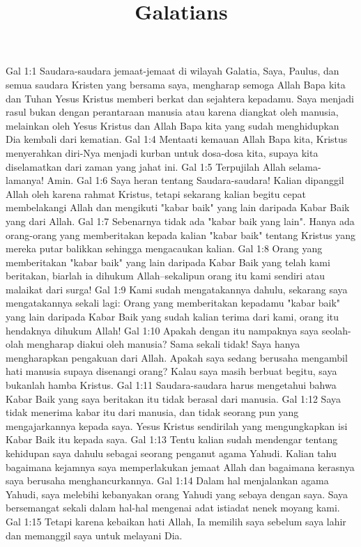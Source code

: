 

\title{Galatians}

Gal 1:1  Saudara-saudara jemaat-jemaat di wilayah Galatia, Saya, Paulus, dan semua saudara Kristen yang bersama saya, mengharap semoga Allah Bapa kita dan Tuhan Yesus Kristus memberi berkat dan sejahtera kepadamu. Saya menjadi rasul bukan dengan perantaraan manusia atau karena diangkat oleh manusia, melainkan oleh Yesus Kristus dan Allah Bapa kita yang sudah menghidupkan Dia kembali dari kematian.
Gal 1:4  Mentaati kemauan Allah Bapa kita, Kristus menyerahkan diri-Nya menjadi kurban untuk dosa-dosa kita, supaya kita diselamatkan dari zaman yang jahat ini.
Gal 1:5  Terpujilah Allah selama-lamanya! Amin.
Gal 1:6  Saya heran tentang Saudara-saudara! Kalian dipanggil Allah oleh karena rahmat Kristus, tetapi sekarang kalian begitu cepat membelakangi Allah dan mengikuti "kabar baik" yang lain daripada Kabar Baik yang dari Allah.
Gal 1:7  Sebenarnya tidak ada "kabar baik yang lain". Hanya ada orang-orang yang memberitakan kepada kalian "kabar baik" tentang Kristus yang mereka putar balikkan sehingga mengacaukan kalian.
Gal 1:8  Orang yang memberitakan "kabar baik" yang lain daripada Kabar Baik yang telah kami beritakan, biarlah ia dihukum Allah--sekalipun orang itu kami sendiri atau malaikat dari surga!
Gal 1:9  Kami sudah mengatakannya dahulu, sekarang saya mengatakannya sekali lagi: Orang yang memberitakan kepadamu "kabar baik" yang lain daripada Kabar Baik yang sudah kalian terima dari kami, orang itu hendaknya dihukum Allah!
Gal 1:10  Apakah dengan itu nampaknya saya seolah-olah mengharap diakui oleh manusia? Sama sekali tidak! Saya hanya mengharapkan pengakuan dari Allah. Apakah saya sedang berusaha mengambil hati manusia supaya disenangi orang? Kalau saya masih berbuat begitu, saya bukanlah hamba Kristus.
Gal 1:11  Saudara-saudara harus mengetahui bahwa Kabar Baik yang saya beritakan itu tidak berasal dari manusia.
Gal 1:12  Saya tidak menerima kabar itu dari manusia, dan tidak seorang pun yang mengajarkannya kepada saya. Yesus Kristus sendirilah yang mengungkapkan isi Kabar Baik itu kepada saya.
Gal 1:13  Tentu kalian sudah mendengar tentang kehidupan saya dahulu sebagai seorang penganut agama Yahudi. Kalian tahu bagaimana kejamnya saya memperlakukan jemaat Allah dan bagaimana kerasnya saya berusaha menghancurkannya.
Gal 1:14  Dalam hal menjalankan agama Yahudi, saya melebihi kebanyakan orang Yahudi yang sebaya dengan saya. Saya bersemangat sekali dalam hal-hal mengenai adat istiadat nenek moyang kami.
Gal 1:15  Tetapi karena kebaikan hati Allah, Ia memilih saya sebelum saya lahir dan memanggil saya untuk melayani Dia.
